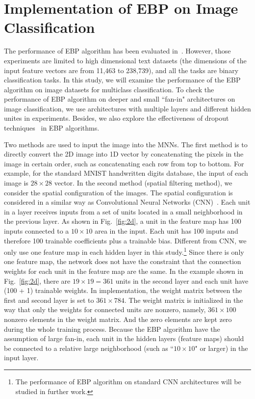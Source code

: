 \documentclass{article} %
\begin{document}
\section{Implementation of EBP on Image Classification}
The performance of EBP algorithm has been evaluated in~\citet{Soudry14}. However, those experiments are limited to high dimensional text datasets (the dimensions of the input feature vectors are from 11,463 to 238,739), and all the tasks are binary classification tasks. In this study, we will examine the performance of the EBP algorithm on image datasets for multiclass classification. To check the performance of EBP algorithm on deeper and small ``fan-in" architectures on  image classification,  we use architectures with multiple layers and different hidden unites in experiments. Besides, we also explore the effectiveness of dropout techniques~\citep{srivastava2014dropout} in EBP algorithms.

Two methods are used to input the image into the MNNs. The first method is to directly convert the 2D image into 1D vector by concatenating the pixels in the image in certain order, such as concatenating each row from top to bottom. For example, for the standard MNIST handwritten digits database, the input of each image is $28 \times 28$ vector. In the second method (spatial filtering method), we consider the spatial configuration of the images. The spatial configuration is considered in a similar way as Convolutional Neural Networks (CNN)~\citep{lecun1998gradient}. Each unit in a layer receives inputs from a set of units located in a small neighborhood in the previous layer.  As shown in Fig.~\ref{fig:2d}, a unit in the feature map has 100 inputs connected to a $10 \times 10$ area in the input. Each unit has 100 inputs and therefore 100 trainable coefficients plus a trainable bias. Different from CNN, we only use one feature map in each hidden layer in this study.\footnote{The performance of EBP algorithm on standard CNN architectures will be studied in further work.} Since there is only one feature map, the network does not have the constraint that the connection weights for each unit in the feature map are the same. In the example shown in Fig.~\ref{fig:2d}, there are $19 \times 19 = 361$ units in the second layer and each unit have (100 + 1) trainable weights. In implementation, the weight matrix between the first and second layer is set to $361 \times 784$. The weight matrix is initialized in the way that only the weights for connected units are nonzero, namely, $361 \times 100$ nonzero elements in the weight matrix. And the zero elements are kept zero during the whole training process. Because the EBP algorithm have the assumption of large fan-in, each unit in the hidden layers (feature maps) should be connected to a relative large neighborhood (such as ``$10 \times 10$" or larger) in the input layer.
\end{document}
